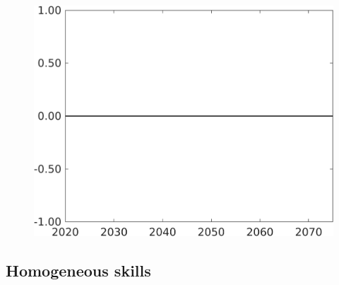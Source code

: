\documentclass[12pt]{article}
\begin{document}
\begin{figure}[h!!]
\begin{minipage}[]{0.32\textwidth}
	\end{minipage}	
	\begin{minipage}[]{0.32\textwidth}
		\includegraphics[width=1\textwidth]{../../codding_model/own_basedOnFried/optimalPol_010922_revision/figures/all_13Sept22/CompTaufPER_bytaul_Equlab_Reg0_F_spillover0_nsk0_xgr0_knspil0_sep1_LFlimit1_emsbase0_countec0_GovRev0_etaa0.79_lgd0.png}
	\end{minipage}	
\end{figure}
\clearpage \newpage
\subsection{Homogeneous skills}
\end{document}
